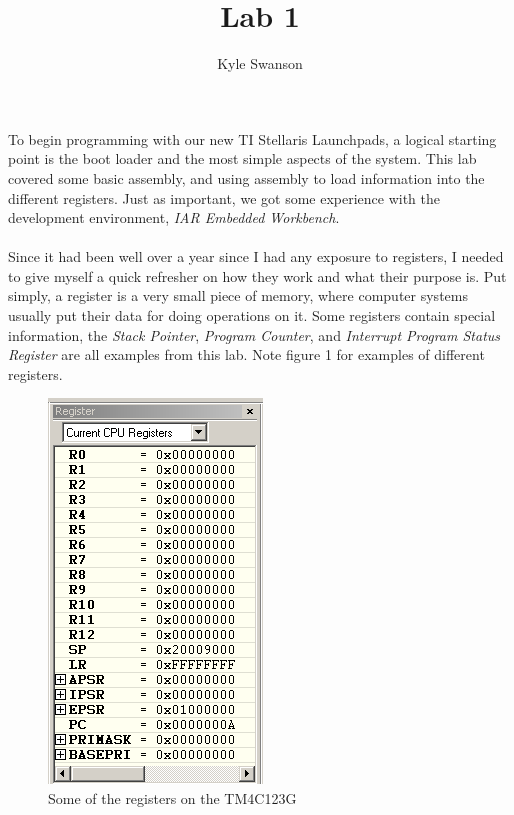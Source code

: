 \documentclass[12pt,a4paper,notitlepage]{report}
\title{Lab 1}
\author{Kyle Swanson}
\begin{document}
\maketitle

\begin{normalsize}
	\paragraph*{}
	To begin programming with our new TI Stellaris Launchpads, a logical starting point is the boot loader and the most simple aspects of the system. This lab covered some basic assembly, and using assembly to load information into the different registers. Just as important, we got some experience with the development environment, \emph{IAR Embedded Workbench}. 
	\paragraph*{}
	Since it had been well over a year since I had any exposure to registers, I needed to give myself a quick refresher on how they work and what their purpose is. Put simply, a register is a very small piece of memory, where computer systems usually put their data for doing operations on it. Some registers contain special information, the \emph{Stack Pointer}, \emph{Program Counter}, and \emph{Interrupt Program Status Register} are all examples from this lab. Note figure 1 for examples of different registers. 
	
\begin{figure}[t!]
	\begin{center}
	\includegraphics[scale=0.7]{pointers.png}
	\caption{Some of the registers on the TM4C123G}
	\end{center}
\end{figure}	
	

\end{normalsize}
\end{document}
